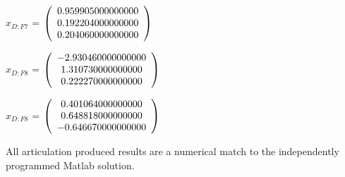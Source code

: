 \begin{description}
$\hat{x}_{D:F7}$  = $\left( \begin{array} {ccc} 0.959905000000000 \\ 0.192204000000000 \\ 0.204060000000000
\end{array} \right)\\ \\$

$x_{D:F8}$  = $\left( \begin{array} {ccc} -2.930460000000000 \\ 1.310730000000000 \\ 0.222270000000000
\end{array} \right)\\ \\$

$\hat{x}_{D:F8}$  = $\left( \begin{array} {ccc} 0.401064000000000 \\ 0.648818000000000 \\ -0.646670000000000
\end{array} \right)\\ \\$

All \ModelDesc articulation produced results are a numerical match to the
independently programmed Matlab solution.


\end{description}

\newpage

\boilerplatetraceability

\newpage
\boilerplatemetrics
